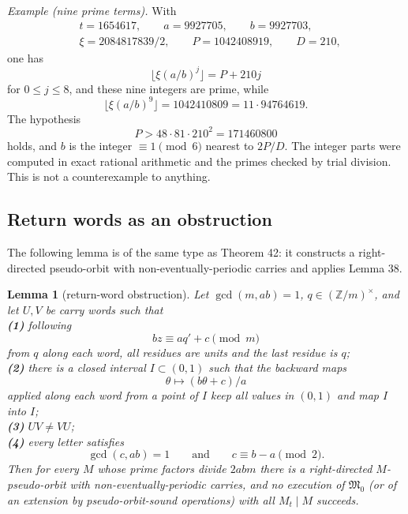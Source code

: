 \documentclass[11pt,reqno]{amsart}
\newtheorem{lemma}[theorem]{Lemma}
\theoremstyle{definition}
\theoremstyle{remark}
\begin{document}
\emph{Example (nine prime terms).} With
\[
\begin{aligned}
&t=1654617,\qquad a=9927705,\qquad b=9927703,\\
&\xi=2084817839/2,\qquad P=1042408919,\qquad D=210,
\end{aligned}
\]
one
has
\[
\lfloor\xi(a/b)^j\rfloor=P+210j
\]
for \(0\le j\le8\), and these
nine integers are prime, while
\[
\lfloor\xi(a/b)^9\rfloor=1042410809=11\cdot94764619.
\]
The hypothesis
\[
P>48\cdot81\cdot210^2=171460800
\]
holds, and \(b\) is the integer
\(\equiv1\pmod6\) nearest to \(2P/D\). The integer parts were computed
in exact rational arithmetic and the primes checked by trial division.
This is not a counterexample to anything.

\subsection{Return words as an obstruction}\label{sec:E.2}

The following lemma is of the same type as Theorem 42: it constructs a
right-directed pseudo-orbit with non-eventually-periodic carries and
applies Lemma 38.

\begin{samepage}
\begin{lemma}[return-word obstruction]\leavevmode\label{thm:69}
Let \(\gcd(m,ab)=1\),
\(q\in(\mathbb Z/m)^\times\), and let \(U,V\) be carry words such that\\
\textbf{(1)} following
\[
bz\equiv aq'+c\pmod m
\]
from \(q\) along each word, all residues are units and the last residue is \(q\);\\
\textbf{(2)} there is a closed interval \(I\subset(0,1)\) such that the backward maps
\[
\theta\mapsto(b\theta+c)/a
\]
applied along each word from a point of \(I\) keep all values in \((0,1)\)
and map \(I\) into \(I\);\\
\textbf{(3)} \(UV\ne VU\);\\
\textbf{(4)} every letter satisfies
\[
\gcd(c,ab)=1\qquad\text{and}\qquad c\equiv b-a\pmod2.
\]
Then for every \(M\) whose prime factors divide \(2abm\) there is a
right-directed \(M\)-pseudo-orbit with non-eventually-periodic carries,
and no execution of \(\mathfrak M_0\) (or of an extension by
pseudo-orbit-sound operations) with all \(M_t\mid M\) succeeds.
\label{thm-end:69}
\end{lemma}
\end{samepage}
\end{document}
